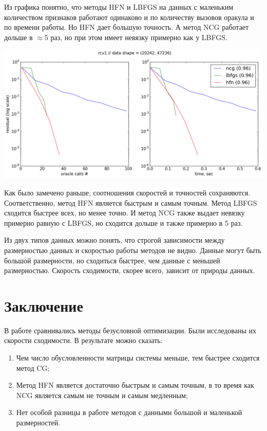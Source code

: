\documentclass[12pt, a4paper]{article}
\begin{document}
        Из графика понятно, что методы HFN и LBFGS на данных с маленьким количеством признаков работают одинаково и по количеству вызовов оракула и по времени работы. Но HFN дает большую точность. А метод NCG работает дольше в $\approx$5 раз, но при этом имеет невязку примерно как у LBFGS.

        \begin{center}\includegraphics[width=\picwidth]{rcv1.png}\end{center}

        Как было замечено раньше, соотношения скоростей и точностей сохраняются. Соответственно, метод HFN является быстрым и самым точным. Метод LBFGS сходится быстрее всех, но менее точно. И метод NCG также выдает невязку примерно равную с LBFGS, но сходится дольше и также примерно в 5 раз.

        Из двух типов данных можно понять, что строгой зависимости между размерностью данных и скоростью работы методов не видно. Данные могут быть большой размерности, но сходиться быстрее, чем данные с меньшей размерностью. Скорость сходимости, скорее всего, зависит от природы данных.


    \section{Заключение}
        В работе сравнивались методы безусловной оптимизации. Были исследованы их скорости сходимости. В результате можно сказать:
        \begin{enumerate}
            \item Чем число обусловленности матрицы системы меньше, тем быстрее сходится метод CG;
            \item Метод HFN является достаточно быстрым и самым точным, в то время как NCG является самым не точным и самым медленным;
            \item Нет особой разницы в работе методов с данными большой и маленькой размерностей.
        \end{enumerate}
\end{document}
